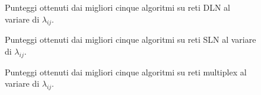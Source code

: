 

\begin{figure}
    
    \centering
    \resizebox{\textwidth}{!}{}
    
    \caption{Punteggi ottenuti dai migliori cinque algoritmi su reti DLN al variare di $\lambda_{ij}$.}
    \label{chart:dlnij}
\end{figure}


\begin{figure}
    
    \centering
    \resizebox{\textwidth}{!}{}
    
    \caption{Punteggi ottenuti dai migliori cinque algoritmi su reti SLN al variare di $\lambda_{ij}$.}
    \label{chart:slnij}
\end{figure}

\begin{figure}
    
    \centering
    \resizebox{\textwidth}{!}{}

    \caption{Punteggi ottenuti dai migliori cinque algoritmi su reti multiplex al variare di $\lambda_{ij}$.}
    \label{chart:muxij}
\end{figure}